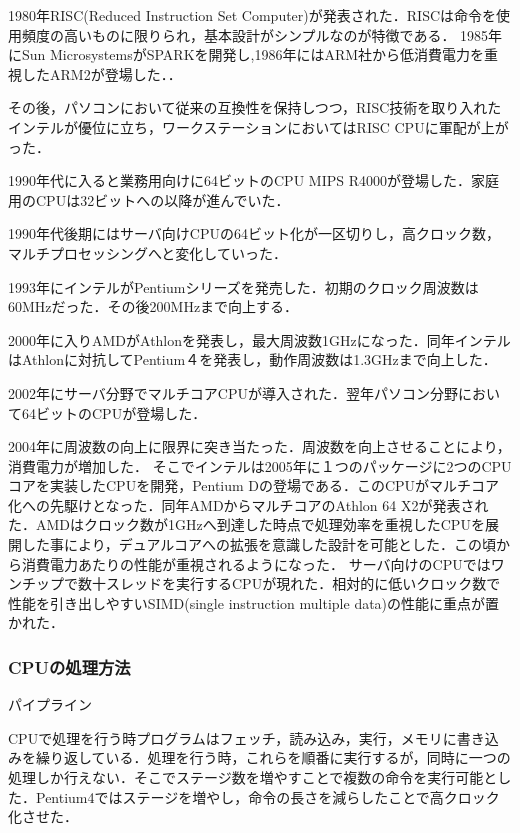 \documentclass[a4j,12pt]{jsarticle}
\begin{document}
1980年RISC(Reduced Instruction Set Computer)が発表された．RISCは命令を使用頻度の高いものに限りられ，基本設計がシンプルなのが特徴である．
1985年にSun MicrosystemsがSPARKを開発し,1986年にはARM社から低消費電力を重視したARM2が登場した．．


その後，パソコンにおいて従来の互換性を保持しつつ，RISC技術を取り入れたインテルが優位に立ち，ワークステーションにおいてはRISC CPUに軍配が上がった．

1990年代に入ると業務用向けに64ビットのCPU MIPS R4000が登場した．家庭用のCPUは32ビットへの以降が進んでいた．

1990年代後期にはサーバ向けCPUの64ビット化が一区切りし，高クロック数，マルチプロセッシングへと変化していった．

1993年にインテルがPentiumシリーズを発売した．初期のクロック周波数は60MHzだった．その後200MHzまで向上する．

2000年に入りAMDがAthlonを発表し，最大周波数1GHzになった．同年インテルはAthlonに対抗してPentium４を発表し，動作周波数は1.3GHzまで向上した．

2002年にサーバ分野でマルチコアCPUが導入された．翌年パソコン分野において64ビットのCPUが登場した．

2004年に周波数の向上に限界に突き当たった．周波数を向上させることにより，消費電力が増加した．
そこでインテルは2005年に１つのパッケージに2つのCPUコアを実装したCPUを開発，Pentium Dの登場である．このCPUがマルチコア化への先駆けとなった．同年AMDからマルチコアのAthlon 64 X2が発表された．AMDはクロック数が1GHzへ到達した時点で処理効率を重視したCPUを展開した事により，デュアルコアへの拡張を意識した設計を可能とした．この頃から消費電力あたりの性能が重視されるようになった．
サーバ向けのCPUではワンチップで数十スレッドを実行するCPUが現れた．相対的に低いクロック数で性能を引き出しやすいSIMD(single instruction multiple data)の性能に重点が置かれた．

\subsubsection{CPUの処理方法}
\begin{Large}
パイプライン
\end {Large}

CPUで処理を行う時プログラムはフェッチ，読み込み，実行，メモリに書き込みを繰り返している．処理を行う時，これらを順番に実行するが，同時に一つの処理しか行えない．そこでステージ数を増やすことで複数の命令を実行可能とした．Pentium4ではステージを増やし，命令の長さを減らしたことで高クロック化させた．

\end{document}
